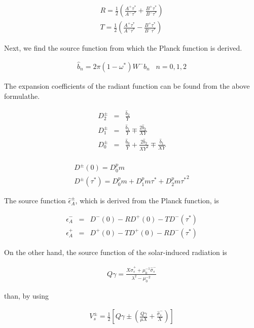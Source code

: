 \begin{eqnarray}
  R  =   \frac{1}{2} \left(  \frac{A^+{\tau^*}}{A^-{\tau^*}} 
                             + \frac{B^+{\tau^*}}{B^-{\tau^*}} \right) \\
  T  =   \frac{1}{2} \left(  \frac{A^+{\tau^*}}{A^-{\tau^*}} 
                             - \frac{B^+{\tau^*}}{B^-{\tau^*}} \right)
\end{eqnarray}

Next, we find the source function from which the Planck function
is derived.

\begin{eqnarray}
  \hat{b}_n = 2 \pi (1-\omega^*) W^- b_n \; \; \; n=0,1,2 
\end{eqnarray}

The expansion coefficients of the radiant function can be found from the above formulathe.

\begin{eqnarray}
  D_2^\pm & = & \frac{\hat{b}_2}{Y} \\
  D_1^\pm & = & \frac{\hat{b}_1}{Y} \mp  \frac{2 \hat{b}_2}{XY} \\
  D_0^\pm & = & \frac{\hat{b}_0}{Y} + \frac{2 \hat{b}_2}{XY^2} 
                \mp  \frac{\hat{b}_1}{XY} \\
\end{eqnarray}

\begin{eqnarray}
  D^\pm(0)       =  D_0^pm \\
  D^\pm(\tau^*)  =  D_0^pm + D_1^pm \tau^* + D_2^pm {\tau^*}^2
\end{eqnarray}

The source function \(\hat{\epsilon}_A^\pm\), which is derived from the
Planck function, is

\begin{eqnarray}
  \hat{\epsilon}_A^- & = & D^-(0) - R D^+(0) - T D^-(\tau^*) \\
  \hat{\epsilon}_A^+ & = & D^+(0) - T D^+(0) - R D^-(\tau^*)
\end{eqnarray}

On the other hand, the source function of the solar-induced radiation is

\begin{eqnarray}
  Q\gamma = \frac{X\hat{\sigma}_s^+ + \mu_0^{-1} \hat{\sigma}_s^-}
                 {\lambda^2 - \mu_0^{-2} }
\end{eqnarray}

than, by using

\begin{eqnarray}
  V_s^\pm = \frac{1}{2} \left[
             Q\gamma \pm \left( \frac{Q\gamma}{\mu X} 
                                + \frac{\hat{\sigma}_s^-}{X} \right)
                        \right]
\end{eqnarray}

